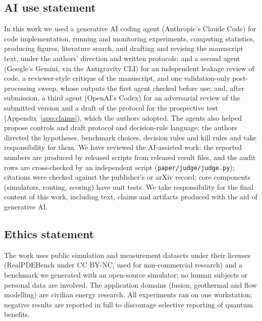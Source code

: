 \documentclass{article}
\begin{document}
\subsection*{AI use statement}
In this work we used a generative AI coding agent (Anthropic's Claude Code) for code implementation, running and
monitoring experiments, computing statistics, producing figures, literature search, and drafting and revising the
manuscript text, under the authors' direction and written protocols; and a second agent (Google's Gemini, via the
Antigravity CLI) for an independent leakage review of code, a reviewer-style critique of the manuscript, and one
validation-only post-processing sweep, whose outputs the first agent checked before use; and, after submission, a third
agent (OpenAI's Codex) for an adversarial review of the submitted version and a draft of the protocol for the
prospective test (Appendix~\ref{app:claims}), which the authors adopted. The agents also helped propose controls and
draft protocol and decision-rule language; the authors directed the hypotheses, benchmark choices, decision rules and
kill rules and take responsibility for them. We have reviewed the AI-assisted work: the reported numbers are produced by
released scripts from released result files, and the audit rows are cross-checked by an independent script
(\texttt{paper/judge/judge.py}); citations were checked against the publisher's or arXiv record; core components
(simulators, routing, scoring) have unit tests. We take responsibility for the final content of this work, including
text, claims and artifacts produced with the aid of generative AI.

\subsection*{Ethics statement}
The work uses public simulation and measurement datasets under their licenses (RealPDEBench under CC BY-NC, used for
non-commercial research) and a benchmark we generated with an open-source simulator; no human subjects or personal
data are involved. The application domains (fusion, geothermal and flow modelling) are civilian energy research. All
experiments ran on one workstation; negative results are reported in full to discourage selective reporting of quantum
benefits.
\end{document}
